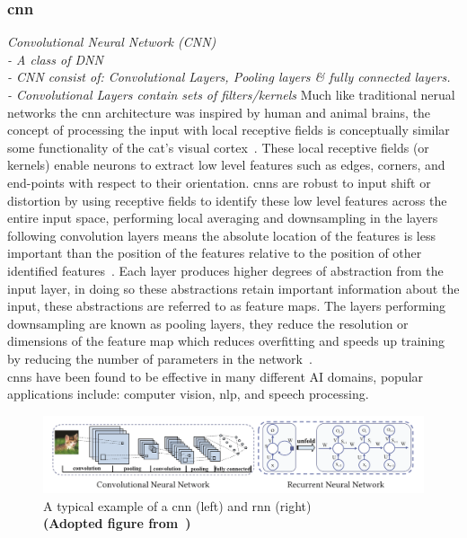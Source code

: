 \documentclass[11pt]{article}
\begin{document}
\subsubsection{\Acrlong*{cnn}}
\emph{
    Convolutional Neural Network (CNN)\\
    - A class of DNN\\
    - CNN consist of: Convolutional Layers, Pooling layers \& fully connected layers.\\
    - Convolutional Layers contain sets of filters/kernels
}
Much like traditional nerual networks the \Acrshort{cnn} architecture was inspired by human and animal brains, the concept of processing the input with local receptive fields is conceptually similar some functionality of the cat's visual cortex~\autocite{hubelReceptiveFieldsBinocular1962,lecunConvolutionalNetworksImages,pouyanfarSurveyDeepLearning2019}. 
These local receptive fields (or kernels) enable neurons to extract low level features such as edges, corners, and end-points with respect to their orientation. \Acrshort{cnn}s are robust to input shift or distortion by using receptive fields to identify these low level features across the entire input space, performing local averaging and downsampling in the layers following convolution layers means the absolute location of the features is less important than the position of the features relative to the position of other identified features~\autocite{lecunConvolutionalNetworksImages}. Each layer produces higher degrees of abstraction from the input layer, in doing so these abstractions retain important information about the input, these abstractions are referred to as feature maps.
The layers performing downsampling are known as pooling layers, they reduce the resolution or dimensions of the feature map which reduces overfitting and speeds up training by reducing the number of parameters in the network~\autocite{pouyanfarSurveyDeepLearning2019}.\\


\acrshort{cnn}s have been found to be effective in many different AI domains, popular applications include: computer vision, \Acrshort{nlp}, and speech processing. 

\begin{figure}
    \includegraphics[width=1\textwidth]{CNN_RNN.png} 
    \caption{A typical example of a \acrshort*{cnn} (left) and \acrshort{rnn} (right)\\ \textbf{(Adopted figure from~\autocite{chenDeepLearningMobile2020})}}
    \label{fig:exampleCnnRnn}   
\end{figure}
\end{document}
